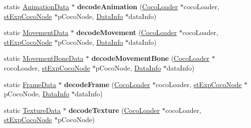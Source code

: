 \begin{DoxyCompactItemize}
\item 
\mbox{\label{classcocostudio_1_1DataReaderHelper_a24734bbc8239a4b120f85a8a2ea25f83}} 
static \hyperlink{classcocostudio_1_1AnimationData}{Animation\+Data} $\ast$ {\bfseries decode\+Animation} (\hyperlink{classcocostudio_1_1CocoLoader}{Coco\+Loader} $\ast$coco\+Loader, \hyperlink{structcocostudio_1_1stExpCocoNode}{st\+Exp\+Coco\+Node} $\ast$p\+Coco\+Node, \hyperlink{structcocostudio_1_1DataReaderHelper_1_1__DataInfo}{Data\+Info} $\ast$data\+Info)
\item 
\mbox{\label{classcocostudio_1_1DataReaderHelper_a47c22f7a8cfbcbd2dbbceab5ed182921}} 
static \hyperlink{classcocostudio_1_1MovementData}{Movement\+Data} $\ast$ {\bfseries decode\+Movement} (\hyperlink{classcocostudio_1_1CocoLoader}{Coco\+Loader} $\ast$coco\+Loader, \hyperlink{structcocostudio_1_1stExpCocoNode}{st\+Exp\+Coco\+Node} $\ast$p\+Coco\+Node, \hyperlink{structcocostudio_1_1DataReaderHelper_1_1__DataInfo}{Data\+Info} $\ast$data\+Info)
\item 
\mbox{\label{classcocostudio_1_1DataReaderHelper_a5cf41d6bd6ffc211328db1b675d3e6f6}} 
static \hyperlink{classcocostudio_1_1MovementBoneData}{Movement\+Bone\+Data} $\ast$ {\bfseries decode\+Movement\+Bone} (\hyperlink{classcocostudio_1_1CocoLoader}{Coco\+Loader} $\ast$coco\+Loader, \hyperlink{structcocostudio_1_1stExpCocoNode}{st\+Exp\+Coco\+Node} $\ast$p\+Coco\+Node, \hyperlink{structcocostudio_1_1DataReaderHelper_1_1__DataInfo}{Data\+Info} $\ast$data\+Info)
\item 
\mbox{\label{classcocostudio_1_1DataReaderHelper_a1256e998a9ac251ad52540be249bd638}} 
static \hyperlink{classcocostudio_1_1FrameData}{Frame\+Data} $\ast$ {\bfseries decode\+Frame} (\hyperlink{classcocostudio_1_1CocoLoader}{Coco\+Loader} $\ast$coco\+Loader, \hyperlink{structcocostudio_1_1stExpCocoNode}{st\+Exp\+Coco\+Node} $\ast$p\+Coco\+Node, \hyperlink{structcocostudio_1_1DataReaderHelper_1_1__DataInfo}{Data\+Info} $\ast$data\+Info)
\item 
\mbox{\label{classcocostudio_1_1DataReaderHelper_ad75364a29a6b5aeca13c24c089bf90c5}} 
static \hyperlink{classcocostudio_1_1TextureData}{Texture\+Data} $\ast$ {\bfseries decode\+Texture} (\hyperlink{classcocostudio_1_1CocoLoader}{Coco\+Loader} $\ast$coco\+Loader, \hyperlink{structcocostudio_1_1stExpCocoNode}{st\+Exp\+Coco\+Node} $\ast$p\+Coco\+Node)

\end{DoxyCompactItemize}
